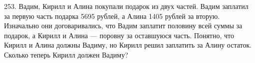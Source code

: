 253. Вадим, Кирилл и Алина покупали подарок из двух частей. Вадим заплатил за первую часть подарка 5695 рублей, а Алина 1405 рублей за вторую. Изначально они договаривались, что Вадим заплатит половину всей суммы за подарок, а Кирилл и Алина --- поровну за оставшуюся часть. Понятно, что Кирилл и Алина должны Вадиму, но Кирилл решил заплатить за Алину остаток. Сколько теперь Кирилл должен Вадиму?\\
